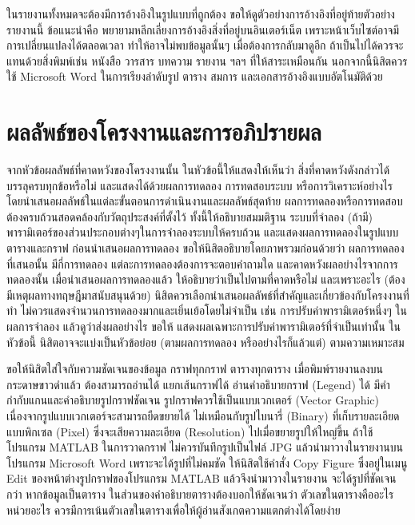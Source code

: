 \documentclass[11pt,a4paper]{article}
\begin{document}
ในรายงานทั้งหมดจะต้องมีการอ้างอิงในรูปแบบที่ถูกต้อง ขอให้ดูตัวอย่างการอ้างอิงที่อยู่ท้ายตัวอย่างรายงานนี้ ข้อแนะนำคือ พยายามหลีกเลี่ยงการอ้างอิงสิ่งที่อยู่บนอินเตอร์เน็ต เพราะหน้าเว็บไซต์อาจมีการเปลี่ยนแปลงได้ตลอดเวลา ทำให้อาจไม่พบข้อมูลนั้นๆ เมื่อต้องการกลับมาดูอีก ถ้าเป็นไปได้ควรจะแทนด้วยสิ่งพิมพ์เช่น หนังสือ วารสาร บทความ รายงาน ฯลฯ ที่ให้สาระเหมือนกัน นอกจากนี้นิสิตควรใช้ Microsoft Word ในการเรียงลำดับรูป ตาราง สมการ และเอกสารอ้างอิงแบบอัตโนมัติด้วย

\section{ผลลัพธ์ของโครงงานและการอภิปรายผล}
จากหัวข้อผลลัพธ์ที่คาดหวังของโครงงานนั้น ในหัวข้อนี้ให้แสดงให้เห็นว่า สิ่งที่คาดหวังดังกล่าวได้บรรลุครบทุกข้อหรือไม่ และแสดงได้ด้วยผลการทดลอง การทดสอบระบบ หรือการวิเคราะห์อย่างไร โดยนำเสนอผลลัพธ์ในแต่ละขั้นตอนการดำเนินงานและผลลัพธ์สุดท้าย ผลการทดลองหรือการทดสอบต้องครบถ้วนสอดคล้องกับวัตถุประสงค์ที่ตั้งไว้ ทั้งนี้ให้อธิบายสมมติฐาน ระบบที่จำลอง (ถ้ามี) พารามิเตอร์ของส่วนประกอบต่างๆในการจำลองระบบให้ครบถ้วน และแสดงผลการทดลองในรูปแบบตารางและกราฟ ก่อนนำเสนอผลการทดลอง ขอให้นิสิตอธิบายโดยภาพรวมก่อนด้วยว่า ผลการทดลองที่เสนอนั้น มีกี่การทดลอง แต่ละการทดลองต้องการจะตอบคำถามใด และคาดหวังผลอย่างไรจากการทดลองนั้น เมื่อนำเสนอผลการทดลองแล้ว ให้อธิบายว่าเป็นไปตามที่คาดหรือไม่ และเพราะอะไร (ต้องมีเหตุผลทางทฤษฎีมาสนับสนุนด้วย) นิสิตควรเลือกนำเสนอผลลัพธ์ที่สำคัญและเกี่ยวข้องกับโครงงานที่ทำ ไม่ควรแสดงจำนวนการทดลองมากและเยิ่นเย้อโดยไม่จำเป็น เช่น การปรับค่าพารามิเตอร์หนึ่งๆ ในผลการจำลอง แล้วดูว่าส่งผลอย่างไร ขอให้ แสดงผลเฉพาะการปรับค่าพารามิเตอร์ที่จำเป็นเท่านั้น ในหัวข้อนี้ นิสิตอาจจะแบ่งเป็นหัวข้อย่อย (ตามผลการทดลอง หรืออย่างไรก็แล้วแต่) ตามความเหมาะสม


ขอให้นิสิตใส่ใจกับความชัดเจนของข้อมูล กราฟทุกกราฟ ตารางทุกตาราง เมื่อพิมพ์รายงานลงบนกระดาษขาวดำแล้ว ต้องสามารถอ่านได้ แยกเส้นกราฟได้ อ่านคำอธิบายกราฟ (Legend) ได้ มีคำกำกับแกนและคำอธิบายรูปกราฟชัดเจน รูปกราฟควรใช้เป็นแบบเวกเตอร์ (Vector Graphic) เนื่องจากรูปแบบเวกเตอร์จะสามารถยืดขยายได้ ไม่เหมือนกับรูปไบนารี่ (Binary) ที่เก็บรายละเอียดแบบพิกเซล (Pixel) ซึ่งจะเสียความละเอียด (Resolution) ไปเมื่อขยายรูปให้ใหญ่ขึ้น ถ้าใช้โปรแกรม MATLAB ในการวาดกราฟ ไม่ควรบันทึกรูปเป็นไฟล์ JPG แล้วนำมาวางในรายงานบนโปรแกรม Microsoft Word เพราะจะได้รูปที่ไม่คมชัด ให้นิสิตใช้คำสั่ง Copy Figure ซึ่งอยู่ในเมนู Edit ของหน้าต่างรูปกราฟของโปรแกรม MATLAB แล้วจึงนำมาวางในรายงาน จะได้รูปที่ชัดเจนกว่า หากข้อมูลเป็นตาราง ในส่วนของคำอธิบายตารางต้องบอกให้ชัดเจนว่า ตัวเลขในตารางคืออะไร หน่วยอะไร ควรมีการเน้นตัวเลขในตารางเพื่อให้ผู้อ่านสังเกตความแตกต่างได้โดยง่าย
\end{document}
